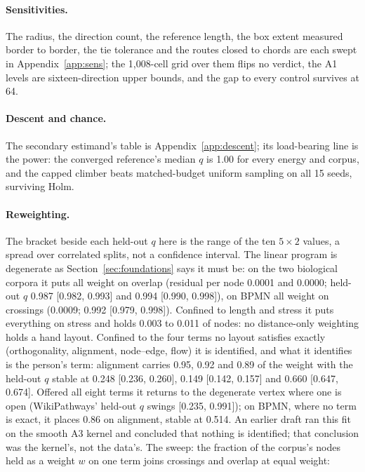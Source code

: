 \documentclass[a4paper,UKenglish]{gd-lipics-v3}
\begin{document}
\paragraph{Sensitivities.} The radius, the direction count, the reference length, the
box extent measured border to border, the tie tolerance and the routes closed to chords
are each swept in Appendix~\ref{app:sens}; the 1{,}008-cell grid over them flips no
verdict, the A1 levels are sixteen-direction upper bounds, and the gap to every
control survives at 64.

\paragraph{Descent and chance.} The secondary estimand's table is
Appendix~\ref{app:descent}; its load-bearing line is the power: the converged
reference's median $q$ is 1.00 for every energy and corpus, and the capped climber beats
matched-budget uniform sampling on all 15 seeds, surviving Holm.

\paragraph{Reweighting.} The bracket beside each held-out $q$ here is the range of the
ten $5{\times}2$ values, a spread over correlated splits, not a confidence interval. The
linear program is degenerate as Section~\ref{sec:foundations} says it must be: on the two
biological corpora it puts all weight on overlap (residual per node 0.0001 and 0.0000;
held-out $q$ 0.987 [0.982, 0.993] and 0.994 [0.990, 0.998]), on BPMN all weight on
crossings (0.0009; 0.992 [0.979, 0.998]). Confined to length and stress it puts
everything on stress and holds 0.003 to 0.011 of nodes: no distance-only weighting holds
a hand layout. Confined to the four terms no layout satisfies exactly (orthogonality,
alignment, node--edge, flow) it is identified, and what it identifies is the person's
term: alignment carries 0.95, 0.92 and 0.89 of the weight with the held-out $q$ stable at
0.248 [0.236, 0.260], 0.149 [0.142, 0.157] and 0.660 [0.647, 0.674]. Offered all eight terms it
returns to the degenerate vertex where one is open (WikiPathways' held-out $q$ swings
[0.235, 0.991]); on BPMN, where no term is exact, it places 0.86 on alignment, stable
at 0.514. An earlier draft ran this fit on the smooth
A3 kernel and concluded that nothing is identified; that conclusion was the kernel's,
not the data's. The
sweep: the fraction of the corpus's nodes held as a weight $w$ on one term joins
crossings and overlap at equal weight:
\end{document}
